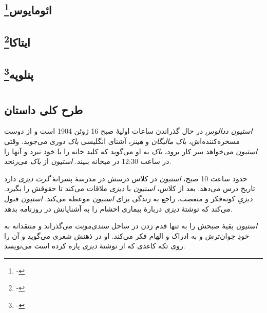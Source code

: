 \documentclass[12pt]{book}
\newcommand{\noun}[1]{\textit{\textcolor{black!70}{#1}}}
\begin{document}
    \chapter[ائومایوس]{ائومایوس\protect\footnote{-}}\label{ep:16}

    \chapter[ایتاکا]{ایتاکا\protect\footnote{-}}\label{ep:17}

    \chapter[پنلوپه]{پنلوپه\protect\footnote{-}}\label{ep:18}

    \part{}
    \chapter{طرح کلی داستان}
    \noun{استیون ددالوس} در حال گذراندن ساعات اولیۀ صبح 16 ژوئن 1904 است و از دوست مسخره‌کننده‌اش، \noun{باک مالیگان} و \noun{هینز}، آشنای انگلیسی \noun{باک} دوری می‌جوید. وقتی \noun{استیون} می‌خواهد سر کار برود، \noun{باک} به او می‌گوید که کلید خانه را با خود نبرد و آنها را در ساعت 12:30 در میخانه ببیند. \noun{استیون} از \noun{باک} می‌رنجد.

    حدود ساعت 10 صبح، \noun{استیون} در کلاس درسش در مدرسۀ پسرانۀ \noun{گرت دیزی} دارد تاریخ درس می‌دهد. بعد از کلاس، \noun{استیون} با \noun{دیزی} ملاقات می‌کند تا حقوقش را بگیرد. \noun{دیزیِ} کوته‌فکر و متعصب، راجع به زندگی برای \noun{استیون} موعظه می‌کند. \noun{استیون} قبول می‌کند که نوشتۀ \noun{دیزی} دربارۀ بیماری احشام را به آشنایانش در روزنامه بدهد.

    \noun{استیون} بقیۀ صبحش را به تنها قدم زدن در ساحل \noun{سندی‌مونت} می‌گذراند و منتقدانه به خودِ جوان‌ترش و به ادراک و الهام فکر می‌کند. او در ذهنش شعری می‌گوید و آن را روی تکه کاغذی که از نوشتۀ \noun{دیزی} پاره کرده است می‌نویسد.
\end{document}
